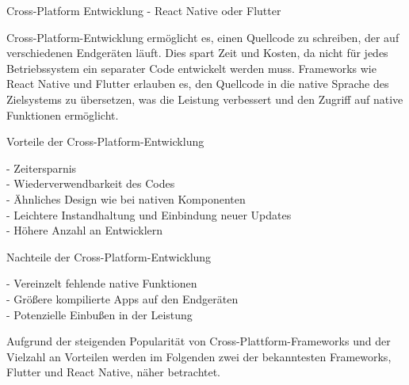 \vspace{0.5cm}

Cross-Platform Entwicklung - React Native oder Flutter

Cross-Platform-Entwicklung ermöglicht es, einen Quellcode zu schreiben, der auf verschiedenen Endgeräten läuft. Dies spart Zeit und Kosten, da nicht für jedes Betriebssystem ein separater Code entwickelt werden muss. Frameworks wie React Native und Flutter erlauben es, den Quellcode in die native Sprache des Zielsystems zu übersetzen, was die Leistung verbessert und den Zugriff auf native Funktionen ermöglicht.

\vspace{0.5cm}

Vorteile der Cross-Platform-Entwicklung

- Zeitersparnis \\
- Wiederverwendbarkeit des Codes \\
- Ähnliches Design wie bei nativen Komponenten \\
- Leichtere Instandhaltung und Einbindung neuer Updates \\
- Höhere Anzahl an Entwicklern

\vspace{0.5cm}

Nachteile der Cross-Platform-Entwicklung

- Vereinzelt fehlende native Funktionen \\
- Größere kompilierte Apps auf den Endgeräten \\
- Potenzielle Einbußen in der Leistung

\vspace{0.5cm}

Aufgrund der steigenden Popularität von Cross-Plattform-Frameworks und der Vielzahl an Vorteilen werden im Folgenden zwei der bekanntesten Frameworks, Flutter und React Native, näher betrachtet.
